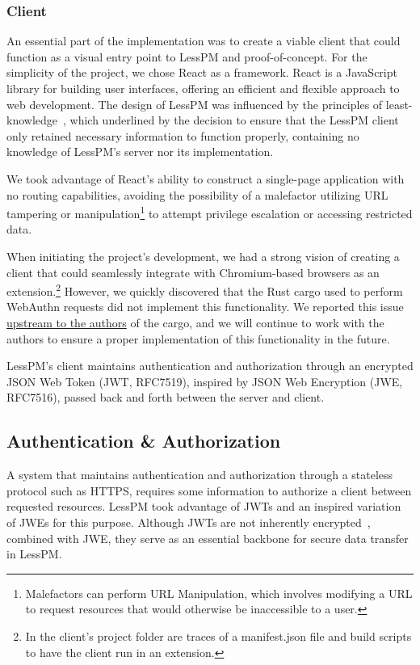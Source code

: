 \subsubsection{Client}
An essential part of the implementation was to create a viable client that could
function as a visual entry point to LessPM and proof-of-concept.
For the simplicity of the project, we chose React as a framework.
React is a JavaScript library for building user interfaces, offering an
efficient and flexible approach to web development.
The design of LessPM was influenced by the principles of
least-knowledge~\cite{lieberherr1990assuring}, which underlined by the decision
to ensure that the LessPM client only retained necessary information to function
properly, containing no knowledge of LessPM's server nor its implementation.

We took advantage of React's ability to construct a single-page application with
no routing capabilities, avoiding the possibility of a malefactor utilizing URL
tampering or manipulation\footnote{
  Malefactors can perform URL Manipulation, which involves modifying a URL to
  request resources that would otherwise be inaccessible to a user.
} to attempt privilege escalation or accessing restricted data.

When initiating the project's development, we had a strong vision of creating
a client that could seamlessly integrate with Chromium-based browsers as
an extension.\footnote{
  In the client's project folder are traces of a manifest.json file and build
  scripts to have the client run in an extension.
}
However, we quickly discovered that the Rust cargo used to perform WebAuthn
requests did not implement this functionality.
We reported this issue
\href{https://github.com/kanidm/webauthn-rs/issues/288}{upstream to the authors}
of the cargo, and we will continue to work with the authors to ensure a proper
implementation of this functionality in the future.

LessPM's client maintains authentication and authorization through an
encrypted JSON Web Token (JWT, RFC7519), inspired by JSON Web
Encryption (JWE, RFC7516), passed back and forth between the server and client.


\subsection{Authentication \& Authorization}\label{subsec:auth-and-auth}
A system that maintains authentication and authorization through a stateless
protocol such as HTTPS, requires some information to authorize a
client between requested resources.
LessPM took advantage of JWTs and an inspired variation of JWEs for this
purpose.
Although JWTs are not inherently encrypted~\cite{RFC7519}, combined with JWE,
they serve as an essential backbone for secure data transfer in LessPM\@.

